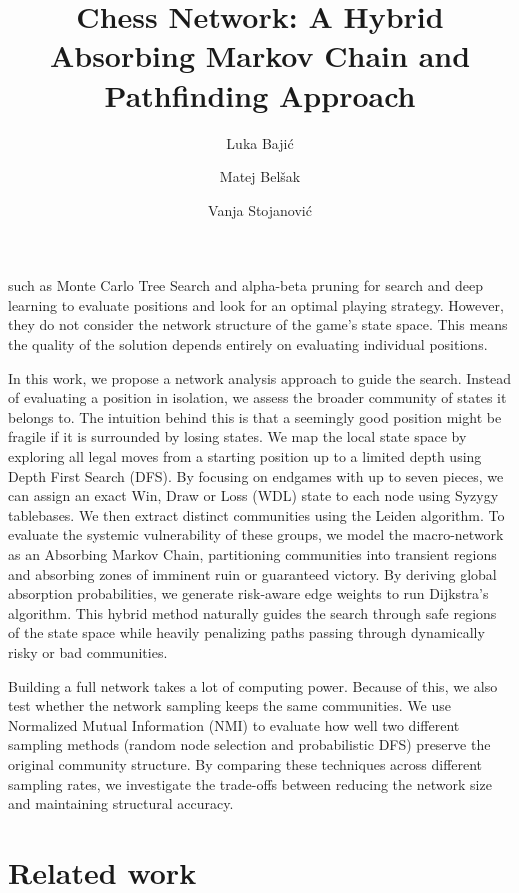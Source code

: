 \documentclass[9pt,twocolumn,twoside]{pnas-report}
\title{Chess Network: A Hybrid Absorbing Markov Chain and Pathfinding Approach}
\author[a]{Luka Bajić}
\author[a]{Matej Belšak}
\author[b]{Vanja Stojanović}
\affil[a]{University of Ljubljana, Faculty of Computer and Information Science, Ve\v{c}na pot 113, SI-1000 Ljubljana, Slovenia}
\affil[b]{University of Ljubljana, Faculty of Mathematics and Physics, Jadranska cesta 21, SI-1000 Ljubljana, Slovenia}
\begin{document}
\maketitle
\thispagestyle{firststyle}

 such as Monte Carlo Tree Search and alpha-beta pruning for search and deep learning to evaluate positions and look for an optimal playing strategy. However, they do not consider the network structure of the game's state space. This means the quality of the solution depends entirely on evaluating individual positions.

In this work, we propose a network analysis approach to guide the search. Instead of evaluating a position in isolation, we assess the broader community of states it belongs to. The intuition behind this is that a seemingly good position might be fragile if it is surrounded by losing states. We map the local state space by exploring all legal moves from a starting position up to a limited depth using Depth First Search (DFS). By focusing on endgames with up to seven pieces, we can assign an exact Win, Draw or Loss (WDL) state to each node using Syzygy tablebases. We then extract distinct communities using the Leiden algorithm. To evaluate the systemic vulnerability of these groups, we model the macro-network as an Absorbing Markov Chain, partitioning communities into transient regions and absorbing zones of imminent ruin or guaranteed victory. By deriving global absorption probabilities, we generate risk-aware edge weights to run Dijkstra's algorithm. This hybrid method naturally guides the search through safe regions of the state space while heavily penalizing paths passing through dynamically risky or bad communities.

Building a full network takes a lot of computing power. Because of this, we also test whether the network sampling keeps the same communities. We use Normalized Mutual Information (NMI) to evaluate how well two different sampling methods (random node selection and probabilistic DFS) preserve the original community structure. By comparing these techniques across different sampling rates, we investigate the trade-offs between reducing the network size and maintaining structural accuracy.

\section*{Related work}
\end{document}
